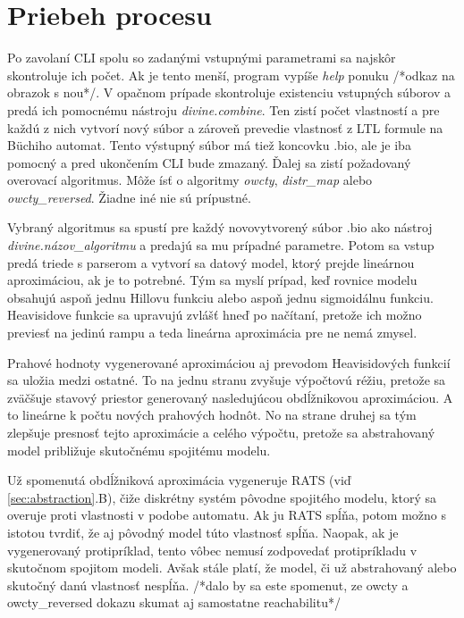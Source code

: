 \documentclass[11pt,final,oneside]{fithesis}
\begin{document}
\section{Priebeh procesu}
Po zavolan\'i CLI spolu so zadan\'ymi vstupn\'ymi parametrami sa najsk\^ or skontroluje ich po\v cet. Ak je tento men\v s\'i, program vyp\'i\v se \textit{help}
ponuku /*odkaz na obrazok s nou*/. V opa\v cnom pr\'ipade skontroluje existenciu vstupn\'ych s\'uborov a pred\'a ich pomocn\'emu n\'astroju {\it divine.combine}.
Ten zist\'i po\v cet vlastnost\'i a pre ka\v zd\'u z nich vytvor\'i nov\'y s\'ubor a z\'arove\v n prevedie vlastnos\v t z LTL formule na B\"uchiho automat. 
Tento v\'ystupn\'y s\'ubor m\'a tie\v z koncovku .bio, ale je iba pomocn\'y a pred ukon\v cen\'im CLI bude zmazan\'y. \v Dalej sa zist\'i po\v zadovan\'y 
overovac\'i algoritmus. M\^ o\v ze \'is\v t o algoritmy {\it owcty}, {\it distr\_map} alebo {\it owcty\_reversed}. \v Ziadne in\'e nie s\'u pr\'ipustn\'e.

Vybran\'y algoritmus sa spust\'i pre ka\v zd\'y novovytvoren\'y s\'ubor .bio ako n\'astroj {\it divine.n\'azov\_algoritmu} a predaj\'u sa mu pr\'ipadn\'e 
parametre. Potom sa vstup pred\'a triede s parserom a vytvor\'i sa datov\'y model, ktor\'y prejde line\'arnou aproxim\'aciou, ak je to potrebn\'e. T\'ym sa
mysl\'i pr\'ipad, ke\v d rovnice modelu obsahuj\'u aspo\v n jednu Hillovu funkciu alebo aspo\v n jednu sigmoid\'alnu funkciu. Heavisidove funkcie sa 
upravuj\'u zvl\'a\v s\v t hne\v d po na\v c\'itan\'i, preto\v ze ich mo\v zno previes\v t na jedin\'u rampu a teda line\'arna aproxim\'acia pre ne nem\'a 
zmysel. 

Prahov\'e hodnoty vygenerovan\'e aproxim\'aciou aj prevodom Heavisidov\'ych funkci\'i sa ulo\v zia medzi ostatn\'e. To na jednu stranu zvy\v suje 
v\'ypo\v ctov\'u r\'e\v ziu, preto\v ze sa zv\" a\v c\v suje stavov\'y priestor generovan\'y nasleduj\'ucou obd\'l\v znikovou aproxim\'aciou. A to line\'arne 
k po\v ctu nov\'ych prahov\'ych hodn\^ ot. No na strane druhej sa t\'ym zlep\v suje presnos\v t tejto aproxim\'acie a cel\'eho v\'ypo\v ctu, preto\v ze sa 
abstrahovan\'y model pribli\v zuje skuto\v cn\'emu spojit\'emu modelu.

U\v z spomenut\'a obd\'l\v znikov\'a aproxim\'acia vygeneruje RATS (vi\v d \ref{sec:abstraction}.B), \v ci\v ze diskr\'etny syst\'em p\^ ovodne spojit\'eho 
modelu, ktor\'y sa overuje proti vlastnosti v podobe automatu. Ak ju RATS sp\'l\v na, potom mo\v zno s istotou tvrdi\v t, \v ze aj p\^ ovodn\'y model t\'uto
vlastnos\v t sp\'l\v na. Naopak, ak je vygenerovan\'y protipr\'iklad, tento v\^ obec nemus\'i zodpoveda\v t protipr\'ikladu v skuto\v cnom spojitom modeli.
Av\v sak st\'ale plat\'i, \v ze model, \v ci u\v z abstrahovan\'y alebo skuto\v cn\'y dan\'u vlastnos\v t nesp\'l\v na. \cite{BIODIVINE}
/*dalo by sa este spomenut, ze owcty a owcty\_reversed dokazu skumat aj samostatne reachabilitu*/
\end{document}
